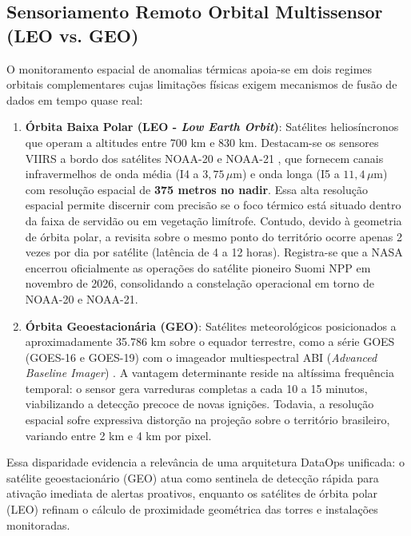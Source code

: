 \subsection{Sensoriamento Remoto Orbital Multissensor (LEO vs. GEO)}
\label{sbc:sensoriamento_orbital}

O monitoramento espacial de anomalias térmicas apoia-se em dois regimes orbitais complementares cujas limitações físicas exigem mecanismos de fusão de dados em tempo quase real:

\begin{enumerate}
    \item \textbf{Órbita Baixa Polar (LEO - \textit{Low Earth Orbit})}: Satélites heliosíncronos que operam a altitudes entre 700 km e 830 km. Destacam-se os sensores VIIRS a bordo dos satélites NOAA-20 e NOAA-21 \cite{schroeder2014viirs}, que fornecem canais infravermelhos de onda média (I4 a $3,75\,\mu\text{m}$) e onda longa (I5 a $11,4\,\mu\text{m}$) com resolução espacial de \textbf{375 metros no nadir}. Essa alta resolução espacial permite discernir com precisão se o foco térmico está situado dentro da faixa de servidão ou em vegetação limítrofe. Contudo, devido à geometria de órbita polar, a revisita sobre o mesmo ponto do território ocorre apenas 2 vezes por dia por satélite (latência de 4 a 12 horas). Registra-se que a NASA encerrou oficialmente as operações do satélite pioneiro Suomi NPP em novembro de 2026, consolidando a constelação operacional em torno de NOAA-20 e NOAA-21.
    \item \textbf{Órbita Geoestacionária (GEO)}: Satélites meteorológicos posicionados a aproximadamente 35.786 km sobre o equador terrestre, como a série GOES (GOES-16 e GOES-19) com o imageador multiespectral ABI (\textit{Advanced Baseline Imager}) \cite{schmit2017goes}. A vantagem determinante reside na altíssima frequência temporal: o sensor gera varreduras completas a cada 10 a 15 minutos, viabilizando a detecção precoce de novas ignições. Todavia, a resolução espacial sofre expressiva distorção na projeção sobre o território brasileiro, variando entre 2 km e 4 km por pixel.
\end{enumerate}

Essa disparidade evidencia a relevância de uma arquitetura DataOps unificada: o satélite geoestacionário (GEO) atua como sentinela de detecção rápida para ativação imediata de alertas proativos, enquanto os satélites de órbita polar (LEO) refinam o cálculo de proximidade geométrica das torres e instalações monitoradas.

